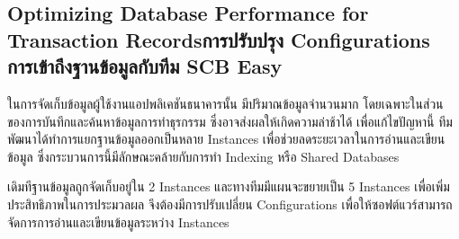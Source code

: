 \subsection{\ifenglish Optimizing Database Performance for Transaction Records\else การปรับปรุง Configurations การเข้าถึงฐานข้อมูลกับทีม SCB Easy\fi}
ในการจัดเก็บข้อมูลผู้ใช้งานแอปพลิเคชันธนาคารนั้น มีปริมาณข้อมูลจำนวนมาก โดยเฉพาะในส่วนของการบันทึกและค้นหาข้อมูลการทำธุรกรรม ซึ่งอาจส่งผลให้เกิดความล่าช้าได้ เพื่อแก้ไขปัญหานี้ ทีมพัฒนาได้ทำการแยกฐานข้อมูลออกเป็นหลาย Instances เพื่อช่วยลดระยะเวลาในการอ่านและเขียนข้อมูล ซึ่งกระบวนการนี้มีลักษณะคล้ายกับการทำ Indexing หรือ Shared Databases

เดิมทีฐานข้อมูลถูกจัดเก็บอยู่ใน 2 Instances และทางทีมมีแผนจะขยายเป็น 5 Instances เพื่อเพิ่มประสิทธิภาพในการประมวลผล จึงต้องมีการปรับเปลี่ยน Configurations เพื่อให้ซอฟต์แวร์สามารถจัดการการอ่านและเขียนข้อมูลระหว่าง Instances
